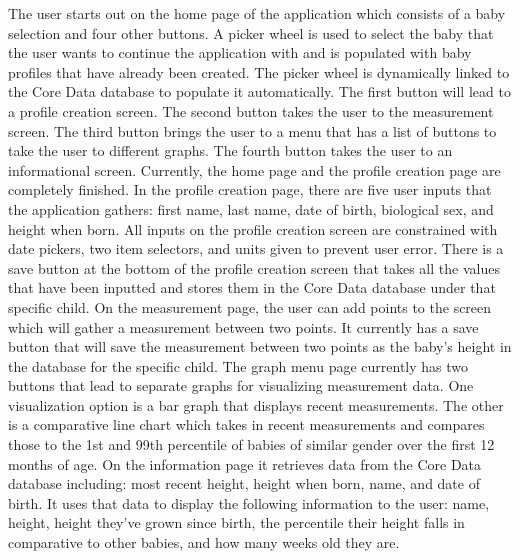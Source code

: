 \documentclass[onecolumn, draftclsnofoot,10pt, compsoc]{IEEEtran}
\begin{document}
The user starts out on the home page of the application which consists of a baby selection and four other buttons. A picker wheel is used to select the baby that the user wants to continue the application with and is populated with baby profiles that have already been created. The picker wheel is dynamically linked to the Core Data database to populate it automatically. The first button will lead to a profile creation screen. The second button takes the user to the measurement screen. The third button brings the user to a menu that has a list of buttons to take the user to different graphs. The fourth button takes the user to an informational screen. Currently, the home page and the profile creation page are completely finished. In the profile creation page, there are five user inputs that the application gathers: first name, last name, date of birth, biological sex, and height when born. All inputs on the profile creation screen are constrained with date pickers, two item selectors, and units given to prevent user error. There is a save button at the bottom of the profile creation screen that takes all the values that have been inputted and stores them in the Core Data database under that specific child. On the measurement page, the user can add points to the screen which will gather a measurement between two points. It currently has a save button that will save the measurement between two points as the baby's height in the database for the specific child. The graph menu page currently has two buttons that lead to separate graphs for visualizing measurement data. One visualization option is a bar graph that displays recent measurements. The other is a comparative line chart which takes in recent measurements and compares those to the 1st and 99th percentile of babies of similar gender over the first 12 months of age. On the information page it retrieves data from the Core Data database including: most recent height, height when born, name, and date of birth. It uses that data to display the following information to the user: name, height, height they've grown since birth, the percentile their height falls in comparative to other babies, and how many weeks old they are.
\end{document}
